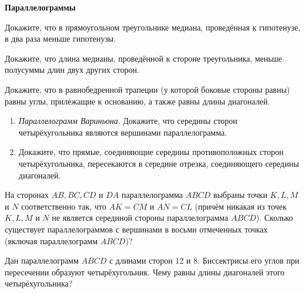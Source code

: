 \documentclass{article}
\begin{document}
    \large

    \begin{center}
        \textbf{Параллелограммы}
    \end{center}

    \begin{enumerate_boxed}

        \item Докажите, что в прямоугольном треугольнике медиана, проведённая к гипотенузе, в два раза меньше гипотенузы.

        \item Докажите, что длина медианы, проведённой к стороне треугольника, меньше полусуммы длин двух других сторон.

        \item Докажите, что в равнобедренной трапеции (у которой боковые стороны равны) равны углы, прилежащие к основанию, а также равны длины диагоналей.

        \item
        \begin{enumerate}
            \item \textit{Параллелограмм Вариньона}.
            Докажите, что середины сторон четырёхугольника являются вершинами параллелограмма.

            \item Докажите, что прямые, соединяющие середины противоположных сторон четырёхугольника, пересекаются в середине отрезка, соединяющего середины диагоналей.
        \end{enumerate}

        \item На сторонах $AB, BC, CD$ и $DA$ параллелограмма $ABCD$ выбраны точки $K, L, M$ и $N$ соответственно так, что $AK=CM$ и $AN=CL$ (причём никакая из точек $K, L, M$ и $N$ не является серединой стороны параллелограмма $ABCD$). Сколько существует параллелограммов с вершинами в восьми отмеченных точках (включая параллелограмм $ABCD$)?

        \item Дан параллелограмм $ABCD$ с длинами сторон 12 и 8.
        Биссектрисы его углов при пересечении образуют четырёхугольник.
        Чему равны длины диагоналей этого четырёхугольника?


\end{enumerate_boxed}
\end{document}
